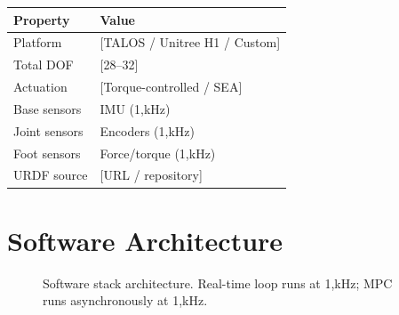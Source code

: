\begin{table}[htb]
  \centering
  
  
  \begin{tabularx}{\linewidth}{lX}
    \toprule
    \textbf{Property}   & \textbf{Value} \\
    \midrule
    Platform            & [TALOS / Unitree H1 / Custom] \\
    Total DOF           & [28–32] \\
    Actuation           & [Torque-controlled / SEA] \\
    Base sensors        & IMU (1,kHz) \\
    Joint sensors       & Encoders (1,kHz) \\
    Foot sensors        & Force/torque (1,kHz) \\
    URDF source         & [URL / repository] \\
    \bottomrule
  \end{tabularx}
\end{table}

\lipsum[27]

\begin{criticalinsight}
\end{criticalinsight}

\section{Software Architecture}




\begin{figure}[htb]
  \centering
  \fbox{\rule{0pt}{4cm}\rule{8cm}{0pt}}  %
  \caption{Software stack architecture. Real-time loop runs at 1,kHz;
           MPC runs asynchronously at 1,kHz.}
  
\end{figure}

\lipsum[28]

